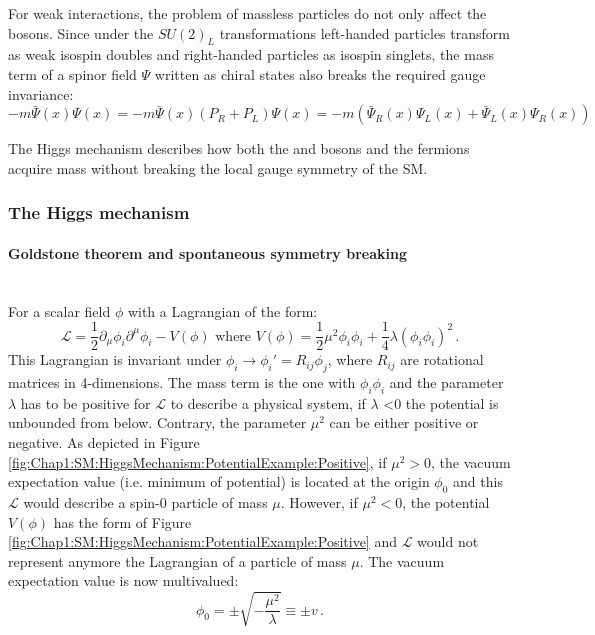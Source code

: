 For weak interactions, the problem of massless particles do not only affect the bosons.  Since under the $SU(2)_L$ transformations left-handed particles
transform as weak isospin doubles and right-handed particles as isospin singlets, the mass term of a spinor field $\Psi$ written as chiral states also
breaks the required gauge invariance: $-m \bar{\Psi}(x) \Psi(x) = -m \bar{\Psi}(x)(P_{R} + P_{L})\Psi(x) = -m (\bar{\Psi}_{R}(x) \Psi_{L}(x) + \bar{\Psi}_{L}(x) \Psi_{R}(x))$

The Higgs mechanism describes how both the \PW and \PZ bosons and the fermions acquire mass without breaking the local gauge symmetry of the SM. 

\subsubsection{The Higgs mechanism}\label{sec:chap1:ParticleMasses:HiggsMechanism}

\paragraph{Goldstone theorem and spontaneous symmetry breaking}\mbox{}\\
For a scalar field $\phi$ with a Lagrangian of the form:
\begin{equation}\label{eq:chap1:HiggsMechanism:Example}
	\mathcal{L} = \frac{1}{2}\partial_{\mu}\phi_{i}\partial^{\mu}\phi_{i} -V(\phi) \textrm{ where } V(\phi) = \frac{1}{2}\mu^{2}\phi_{i} \phi_{i}   + \frac{1}{4}\lambda(\phi_{i} \phi_{i})^{2} \, .
\end{equation}
This Lagrangian is invariant under $\phi_{i} \rightarrow \phi_{i}'= R_{ij}\phi_{j}$, where $R_{ij}$ are rotational matrices in 4-dimensions.
 The mass term is the one with $\phi_{i} \phi_{i}$ and 
the parameter $\lambda$ has to be positive for $\mathcal{L}$ to describe a physical system,  if $\lambda$ <0 the potential is unbounded from below.
Contrary, the parameter $\mu^{2}$ can be either positive or negative.  
As depicted in Figure \ref{fig:Chap1:SM:HiggsMechanism:PotentialExample:Positive}, if $\mu^{2}>0$, the vacuum expectation value 
(i.e. minimum of potential) is located at the origin $\phi_0$ and this $\mathcal{L}$  would describe a spin-0 particle of mass $\mu$. 
However, if $\mu^{2}<0$, the potential $V(\phi)$ has the form of Figure \ref{fig:Chap1:SM:HiggsMechanism:PotentialExample:Positive} and $\mathcal{L}$
would not represent anymore the Lagrangian of a particle of mass $\mu$. The vacuum expectation value is now multivalued:
\begin{equation*}
	\phi_{0} = \pm \sqrt{-\frac{\mu^{2}}{\lambda}} \equiv \pm v \, .
\end{equation*}


